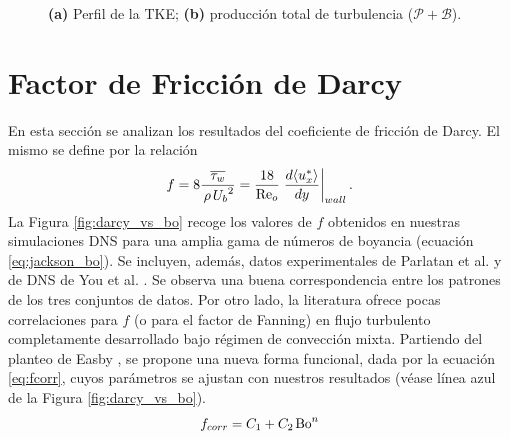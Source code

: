\begin{figure}[H]
  \centering
  \caption{\textbf{(a)} Perfil de la TKE; \textbf{(b)} producción total de turbulencia ($\mathcal{P} + \mathcal{B}$).}
  \label{fig:budgets_prod}
\end{figure}



\section{Factor de Fricción de Darcy}

En esta sección se analizan los resultados del coeficiente de fricción de Darcy. El mismo se define por la relación
\begin{equation}
f = 8 \frac{ \overline{\tau_w}}{\hspace{0.5mm} \rho \hspace{0.5mm} {U_b}^2 }  = \frac{18}{\text{Re}_o} \left.\frac{d \langle u^*_x \rangle}{dy}\right\vert_{wall} \text{.}
\label{eq:darcy}
\end{equation}
La Figura \ref{fig:darcy_vs_bo} recoge los valores de $f$ obtenidos en nuestras simulaciones DNS para una amplia gama de números de boyancia (ecuación \ref{eq:jackson_bo}). Se incluyen, además, datos experimentales de Parlatan et al. \cite{parlatan1996buoyancy} y de DNS de You et al. \cite{you2003direct}. Se observa una buena correspondencia entre los patrones de los tres conjuntos de datos. Por otro lado, la literatura ofrece pocas correlaciones para $f$ (o para el factor de Fanning) en flujo turbulento completamente desarrollado bajo régimen de convección mixta. Partiendo del planteo de Easby \cite{easby1978effect}, se propone una nueva forma funcional, dada por la ecuación \ref{eq:fcorr}, cuyos parámetros se ajustan con nuestros resultados (véase línea azul de la Figura \ref{fig:darcy_vs_bo}).
\begin{equation}
f_{corr} = C_1 + C_2 \hspace*{0.5mm} \text{Bo}^n
\label{eq:fcorr}
\end{equation}

